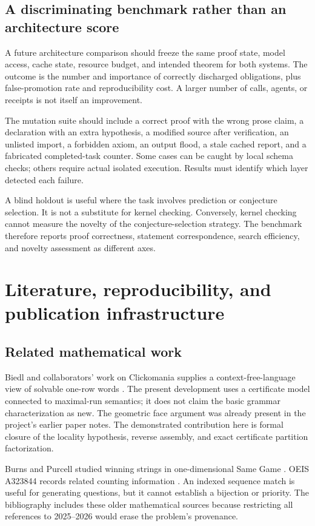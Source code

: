 \documentclass[11pt,reqno]{amsart}
\theoremstyle{definition}
\begin{document}
\subsection{A discriminating benchmark rather than an architecture score}
A future architecture comparison should freeze the same proof state, model
access, cache state, resource budget, and intended theorem for both systems.
The outcome is the number and importance of correctly discharged obligations,
plus false-promotion rate and reproducibility cost. A larger number of calls,
agents, or receipts is not itself an improvement.

The mutation suite should include a correct proof with the wrong prose claim,
a declaration with an extra hypothesis, a modified source after verification,
an unlisted import, a forbidden axiom, an output flood, a stale cached report,
and a fabricated completed-task counter. Some cases can be caught by local
schema checks; others require actual isolated execution. Results must identify
which layer detected each failure.

A blind holdout is useful where the task involves prediction or conjecture
selection. It is not a substitute for kernel checking. Conversely, kernel
checking cannot measure the novelty of the conjecture-selection strategy.
The benchmark therefore reports proof correctness, statement correspondence,
search efficiency, and novelty assessment as different axes.

\section{Literature, reproducibility, and publication infrastructure}\label{sec:publication}
\subsection{Related mathematical work}
Biedl and collaborators' work on Clickomania supplies a context-free-language
view of solvable one-row words \cite{Biedl2002}. The present development uses a
certificate model connected to maximal-run semantics; it does not claim the
basic grammar characterization as new. The geometric face argument was
already present in the project's earlier paper notes. The demonstrated
contribution here is formal closure of the locality hypothesis, reverse
assembly, and exact certificate partition factorization.

Burns and Purcell studied winning strings in one-dimensional Same Game
\cite{BurnsPurcell2007}. OEIS A323844 records related counting information
\cite{OEISA323844}. An indexed sequence match is useful for generating
questions, but it cannot establish a bijection or priority. The bibliography
includes these older mathematical sources because restricting all references
to 2025--2026 would erase the problem's provenance.
\end{document}
